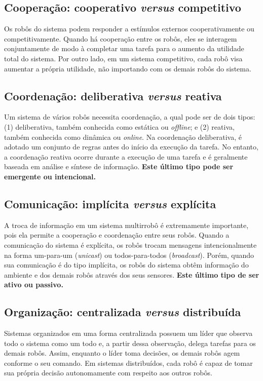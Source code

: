         \subsection{Cooperação: cooperativo \textit{versus} competitivo}
            Os robôs do sistema podem responder a estímulos externos cooperativamente ou competitivamente. Quando há cooperação entre os robôs, eles se interagem conjuntamente de modo à completar uma tarefa para o aumento da utilidade total do sistema. Por outro lado, em um sistema competitivo, cada robô visa aumentar a própria utilidade, não importando com os demais robôs do sistema.
        
        \subsection{Coordenação: deliberativa \textit{versus} reativa}
            Um sistema de vários robôs necessita coordenação, a qual pode ser de dois tipos: (1) deliberativa, também conhecida como estática ou \textit{offline}; e (2) reativa, também conhecida como dinâmica ou \textit{online}. Na coordenação deliberativa, é adotado um conjunto de regras antes do início da execução da tarefa. No entanto, a coordenação reativa ocorre durante a execução de uma tarefa e é geralmente baseada em análise e síntese de informação. \textbf{\color{red}Este último tipo pode ser emergente ou intencional.}
        
        \subsection{Comunicação: implícita \textit{versus} explícita}
            A troca de informação em um sistema multirrobô é extremamente importante, pois ela permite a cooperação e coordenação entre seus robôs. Quando a comunicação do sistema é explícita, os robôs trocam mensagens intencionalmente na forma um-para-um (\textit{unicast}) ou todos-para-todos (\textit{broadcast}). Porém, quando sua comunicação é do tipo implícita, os robôs do sistema obtêm informação do ambiente e dos demais robôs através dos seus sensores. \textbf{\color{red}Este último tipo de ser ativo ou passivo.}
        
        \subsection{Organização: centralizada \textit{versus} distribuída}
            Sistemas organizados em uma forma centralizada possuem um líder que observa todo o sistema como um todo e, a partir dessa observação, delega tarefas para os demais robôs. Assim, enquanto o líder toma decisões, os demais robôs agem conforme o seu comando. Em sistemas distribuídos, cada robô é capaz de tomar sua própria decisão autonomamente com respeito aos outros robôs. 
    
